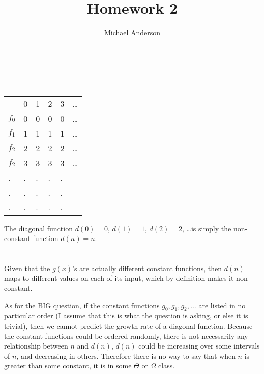 \documentclass{article}
\author{Michael Anderson}
\title{Homework 2}
\begin{document}
\maketitle
{}
\\
\flushleft
\newpage

\section{}
\begin{tabular}{l l l l l l}
& 0 & 1 & 2 & 3 & \ldots \\
$f_0$ & 0 & 0 & 0 & 0 & \ldots \\
$f_1$ & 1 & 1 & 1 & 1 & \ldots \\
$f_2$ & 2 & 2 & 2 & 2 & \ldots \\
$f_2$ & 3 & 3 & 3 & 3 & \ldots \\
. & . & . & . & .\\
. & . & . & . & .\\
. & . & . & . & .\\
\end{tabular}

\vspace{1em}

The diagonal function $d(0) = 0$, $d(1) = 1$, $d(2) = 2$, \ldots is simply the
non-constant function $d(n) = n$.

\section{}
Given that the  $g(x)$'s are actually different constant functions, then $d(n)$
maps to different values on each of its input, which by definition makes it
non-constant.

\vspace{1em}

As for the BIG question, if the constant functions $g_0, g_1, g_2, \ldots$
are listed in no particular
order (I assume that this is what the question is asking, or else it is
trivial), then we cannot predict the growth rate of a diagonal function.
Because the constant functions could be ordered randomly, there is not 
necessarily any relationship between $n$ and $d(n)$, $d(n)$ could be increasing
over some intervals of $n$, and decreasing in others. Therefore there is no way
to say that when $n$ is greater than some constant, it is in some $\Theta$ or
$\Omega$ class.

\section{}
\end{document}
